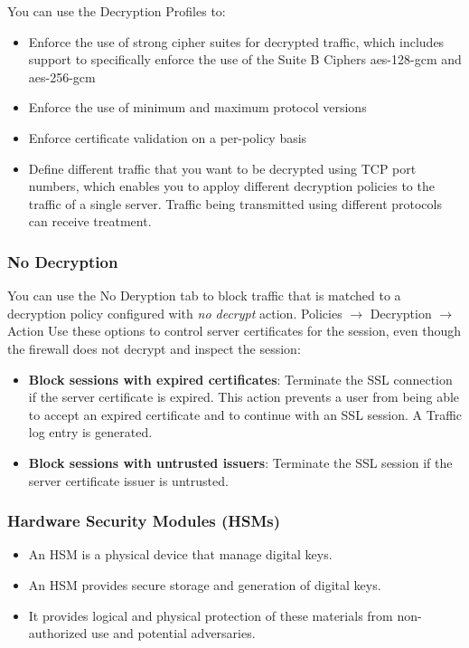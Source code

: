 You can use the Decryption Profiles to:
\begin{itemize}
    \item Enforce the use of strong cipher suites for decrypted traffic, which includes support to specifically enforce the use of the Suite B Ciphers aes-128-gcm and aes-256-gcm
    \item Enforce the use of minimum and maximum protocol versions
    \item Enforce certificate validation on a per-policy basis
    \item Define different traffic that you want to be decrypted using TCP port numbers, which enables you to apploy different decryption policies to the traffic of a single server. Traffic being transmitted using different protocols can receive treatment.
\end{itemize}

\subsubsection{No Decryption}
You can use the No Deryption tab to block traffic that is matched to a decryption policy configured with \textit{no decrypt} action.
Policies $\rightarrow$ Decryption $\rightarrow$ Action
Use these options to control server certificates for the session, even though the firewall does not decrypt and inspect the session:
\begin{itemize}
    \item \textbf{Block sessions with expired certificates}: Terminate the SSL connection if the server certificate is expired. This action prevents a user from being able to accept an expired certificate and to continue with an SSL session. A Traffic log entry is generated.
    \item \textbf{Block sessions with untrusted issuers}: Terminate the SSL session if the server certificate issuer is untrusted.
\end{itemize}

\subsubsection{Hardware Security Modules (HSMs)}
\begin{itemize}
    \item An HSM is a physical device that manage digital keys.
    \item An HSM provides secure storage and generation of digital keys.
    \item It provides logical and physical protection of these materials from non-authorized use and potential adversaries.
\end{itemize}

